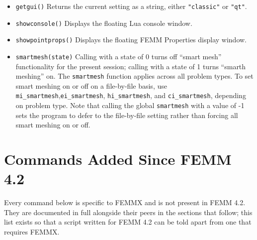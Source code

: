 \begin{itemize}
The setting lasts for the current session only. It starts out matching the
{\tt <PreferredGUI>} entry in {\tt femm.cfg}, so a script that never calls
{\tt setgui} renders with whichever GUI is preferred, but {\tt setgui}
deliberately does not write that entry back --- a script asking for one
image in a particular style should not change which GUI opens by default
afterwards. Use the {\tt View} menu's {\tt Switch To\ldots} item for that.

\item {\tt getgui()} Returns the current setting as a string, either
{\tt "classic"} or {\tt "qt"}.

\item{\tt showconsole()} Displays the floating Lua console window.

\item{\tt showpointprops()} Displays the floating FEMM Properties
display window.

\item{\tt smartmesh(state)} Calling with a state of 0 turns off ``smart mesh'' functionality for the present session; calling with a state of 1 turns ``smarth meshing'' on. The {\tt smartmesh} function applies across all problem types. 
To set smart meshing on or off on a file-by-file basis, use  \verb+mi_smartmesh+,\verb+ei_smartmesh+, \verb+hi_smartmesh+, and \verb+ci_smartmesh+, depending on problem type.  Note that calling the global \verb+smartmesh+ with a value of -1 sets the program to defer to the file-by-file setting rather than forcing all smart meshing on or off.
\end{itemize}



\section{Commands Added Since FEMM 4.2}

Every command below is specific to FEMMX and is not present in FEMM
4.2. They are documented in full alongside their peers in the sections
that follow; this list exists so that a script written for FEMM 4.2 can
be told apart from one that requires FEMMX.

